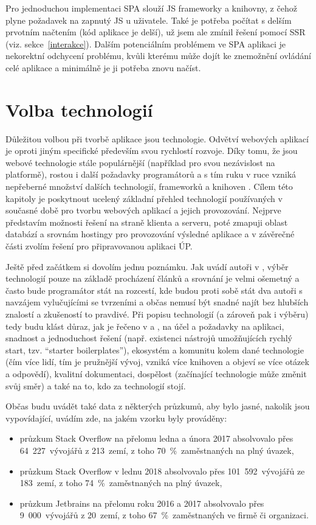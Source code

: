         Pro jednoduchou implementaci SPA slouží JS frameworky a knihovny, z čehož plyne požadavek na zapnutý JS u uživatele. Také je potřeba počítat s delším prvotním načtením (kód aplikace je delší), už jsem ale zmínil řešení pomocí SSR (viz. sekce~\ref{interakce}). Dalším potenciálním problémem ve SPA aplikaci je nekorektní odchycení problému, kvůli kterému může dojít ke znemožnění ovládání celé aplikace a minimálně je ji potřeba znovu načíst. \cite{spa1}

\chapter{Volba technologií}\label{technologie}
Důležitou volbou při tvorbě aplikace jsou technologie. Odvětví webových aplikací je oproti jiným specifické především svou rychlostí rozvoje. Díky tomu, že jsou webové technologie stále populárnější (například pro svou nezávislost na platformě), rostou i další požadavky programátorů a s tím ruku v ruce vzniká nepřeberné množství dalších technologií, frameworků a knihoven \cite{moderni-webapps,moderni-webapps2}. Cílem této kapitoly je poskytnout ucelený základní přehled technologií používaných v současné době pro tvorbu webových aplikací a jejich provozování. Nejprve představím možnosti řešení na straně klienta a serveru, poté zmapuji oblast databází a srovnám hostingy pro provozování výsledné aplikace a v závěrečné části zvolím řešení pro připravovanou aplikaci ÚP.

Ještě před začátkem si dovolím jednu poznámku. Jak uvádí autoři v \cite{technologie1}, výběr technologií pouze na základě procházení článků a srovnání je velmi ošemetný a často bude programátor stát na rozcestí, kde budou proti sobě stát dva autoři s navzájem vylučujícími se tvrzeními a občas nemusí být snadné najít bez hlubších znalostí a zkušeností to pravdivé. Při popisu technologií (a zároveň pak i výběru) tedy budu klást důraz, jak je řečeno v \cite{technologie1} a \cite{technologie2}, na účel a požadavky na aplikaci, snadnost a jednoduchost řešení (např. existenci nástrojů umožňujících rychlý start, tzv. \enquote{starter boilerplates}), ekosystém a komunitu kolem dané technologie (čím více lidí, tím je pružnější vývoj, vzniká více knihoven a objeví se více otázek a odpovědí), kvalitní dokumentaci, dospělost (začínající technologie může změnit svůj směr) a také na to, kdo za technologií stojí.

Občas budu uvádět také data z některých průzkumů, aby bylo jasné, nakolik jsou vypovídající, uvádím zde, na jakém vzorku byly prováděny:
\begin{itemize}
    \item průzkum Stack Overflow \cite{stack-stats17} na přelomu ledna a února 2017 absolvovalo přes 64~227~vývojářů z 213~zemí, z toho 70~\%~zaměstnaných na plný úvazek,
    \item průzkum Stack Overflow \cite{stack-stats18} v lednu 2018 absolvovalo přes 101~592~vývojářů ze 183~zemí, z toho 74~\%~zaměstnaných na plný úvazek,
    \item průzkum Jetbrains \cite{jetbrains-stats} na přelomu roku 2016 a 2017 absolvovalo přes 9~000~vývojářů z 20~zemí, z toho 67~\%~zaměstnaných ve firmě či organizaci.
\end{itemize}

